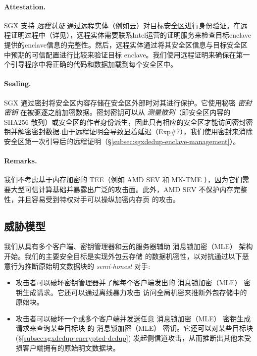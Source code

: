 \paragraph*{Attestation.} SGX 支持 \textit{ 远程认证} 通过远程实体（例如云）对目标安全区进行身份验证。在远程证明过程中（详见\cite{sgx}），远程实体需要联系Intel运营的证明服务来检查目标enclave提供的enclave信息的完整性。然后，远程实体通过将其安全区信息与目标安全区中预期的可信配置进行比较来验证目标 enclave。我们使用远程证明来确保在第一个引导程序中将正确的代码和数据加载到每个安全区中。

\paragraph*{Sealing.} SGX 通过密封将安全区内容存储在安全区外部时对其进行保护。它使用秘密 \textit{ 密封密钥} 在被驱逐之前加密数据。密封密钥可以从 \textit{ 测量散列}（即安全区内容的 SHA256 散列）或安全区的作者身份派生，因此只有相应的安全区才能访问密封密钥并解密密封数据.由于远程证明会导致显着延迟（Exp\#7），我们使用密封来消除安全区第一次引导后的远程证明（\S\ref{subsec:sgxdedup-enclave-management}）。

\paragraph*{Remarks.} 我们不考虑基于内存加密的 TEE（例如 AMD SEV \cite{AMDSEV} 和 MK-TME \cite{Mktem}），因为它们需要大型可信计算基础并暴露出广泛的攻击面\cite{mofrad18}。此外，AMD SEV \cite{AMDSEV} 不保护内存完整性，并且容易受到特权对手可以操纵加密内存页 \cite{mofrad18} 的攻击。

\subsection{威胁模型}
\label{subsec:sgxdedup-threat}

 我们从具有多个客户端、密钥管理器和云的服务器辅助 消息锁加密（MLE） 架构 \cite{bellare2013DupLESS} 开始。我们的主要安全目标是实现外包云存储 \cite{bellare2013DupLESS} 的数据机密性，以对抗通过以下恶意行为推断原始明文数据块的 \textit{ semi-honest} 对手:

\begin{itemize}[leftmargin=*]
\item 攻击者可以破坏密钥管理器并了解每个客户端发出的 消息锁加密（MLE） 密钥生成请求。它还可以通过离线暴力攻击 \cite{bellare2013DupLESS} 访问全局机密来推断外包存储中的原始块。
    \item 攻击者可以破坏一个或多个客户端并发送任意 消息锁加密（MLE） 密钥生成请求来查询某些目标块 \cite{bellare2013DupLESS} 的 消息锁加密（MLE） 密钥。它还可以对某些目标块 \cite{harnik10} (\S\ref{subsec:sgxdedup-encrypted-dedup}) 发起侧信道攻击，从而推断出其他未受损客户端拥有的原始明文数据块。
\end{itemize}

